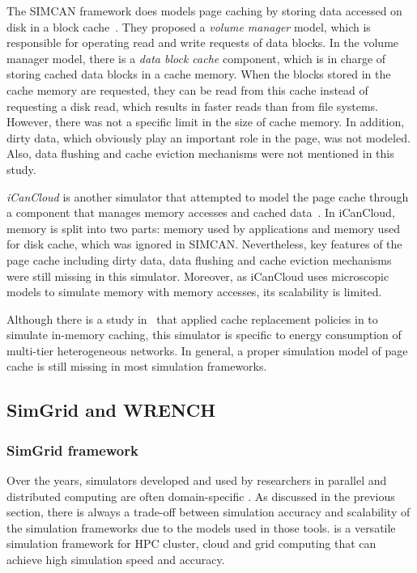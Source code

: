 The SIMCAN framework does models page caching by storing data 
accessed on disk in a block cache~\cite{nunez2012simcan}. 
They proposed a \textit{volume manager} model, which is responsible for 
operating read and write requests of data blocks. 
In the volume manager model, there is a \textit{data block cache} component, 
which is in charge of storing cached data blocks in a cache memory. 
When the blocks stored in the cache memory are requested, they can be 
read from this cache instead of requesting a disk read, which results in 
faster reads than from file systems.
However, there was not a specific limit in the size of cache memory. 
In addition, dirty data, which obviously play an important role in the page,
was not modeled. 
Also, data flushing and cache eviction mechanisms were not mentioned 
in this study. 

\textit{iCanCloud} is another simulator that attempted to model the page cache 
through a component that manages memory accesses and cached 
data~\cite{nunez2012icancloud}. 
In iCanCloud, memory is split into two parts: memory used by applications 
and memory used for disk cache, which was ignored in SIMCAN. 
Nevertheless, key features of the page cache including dirty data, 
data flushing and cache eviction mechanisms were still missing 
in this simulator.
Moreover, as iCanCloud uses microscopic models to simulate memory 
with memory accesses, its scalability is limited. 

Although there is a study in~\cite{xu2018saving} that applied cache 
replacement policies in to simulate in-memory caching, this simulator 
is specific to energy consumption of multi-tier heterogeneous networks.
In general, a proper simulation model of page cache is still missing 
in most simulation frameworks.

\subsection{SimGrid and WRENCH}

\subsubsection{SimGrid framework}

Over the years, simulators developed and used by researchers in 
parallel and distributed computing are often domain-specific 
\cite{casanova2014simgrid}.
As discussed in the previous section, there is always a trade-off between 
simulation accuracy and scalability of the simulation frameworks due 
to the models used in those tools. 
\simgrid is a versatile simulation framework for HPC cluster, cloud and 
grid computing that can achieve high simulation speed and accuracy.

